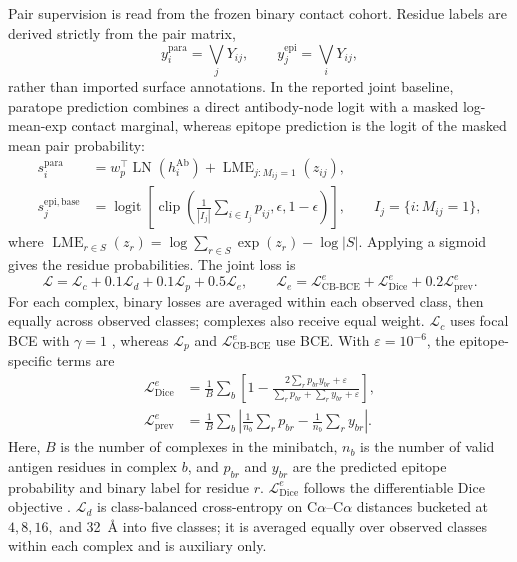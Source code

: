 \documentclass[10pt]{article}
\begin{document}
Pair supervision is read from the frozen binary contact cohort. Residue labels
are derived strictly from the pair matrix,
\begin{equation}
 y_i^{\mathrm{para}}=\bigvee_j Y_{ij}, \qquad
 y_j^{\mathrm{epi}}=\bigvee_i Y_{ij},
 \end{equation}
rather than imported surface annotations. In the reported joint baseline,
paratope prediction combines a direct antibody-node logit with a masked
log-mean-exp contact marginal, whereas epitope prediction is the logit of the
masked mean pair probability:
\begin{equation}
 \begin{aligned}
 s_i^{\mathrm{para}}
 &=w_p^\top\operatorname{LN}(h_i^{\mathrm{Ab}})
 +\operatorname{LME}_{j:M_{ij}=1}(z_{ij}),\\
 s_j^{\mathrm{epi,base}}
 &=\operatorname{logit}\!\left[
 \operatorname{clip}\!\left(
 \frac{1}{|I_j|}\sum_{i\in I_j}p_{ij},\epsilon,1-\epsilon
 \right)\right],
 \qquad I_j=\{i:M_{ij}=1\},
 \end{aligned}
 \label{eq:baseline-residue-readouts}
\end{equation}
where $\operatorname{LME}_{r\in S}(z_r)=
\log\sum_{r\in S}\exp(z_r)-\log|S|$. Applying a sigmoid gives the residue
probabilities. The joint loss is
\begin{equation}
 \mathcal{L}=\mathcal{L}_{c}+0.1\mathcal{L}_{d}
 +0.1\mathcal{L}_{p}+0.5\mathcal{L}_{e}, \qquad
 \mathcal{L}_{e}=\mathcal{L}_{\mathrm{CB\text{-}BCE}}^{e}
 +\mathcal{L}_{\mathrm{Dice}}^{e}+0.2\mathcal{L}_{\mathrm{prev}}^{e}.
 \label{eq:loss}
\end{equation}
For each complex, binary losses are averaged within each observed class, then
equally across observed classes; complexes also receive equal weight.
$\mathcal{L}_{c}$ uses focal BCE with $\gamma=1$ \citep{lin2017focal}, whereas
$\mathcal{L}_{p}$ and $\mathcal{L}_{\mathrm{CB\text{-}BCE}}^{e}$ use BCE.
With $\varepsilon=10^{-6}$, the epitope-specific terms are
\begin{equation}
 \begin{aligned}
 \mathcal{L}_{\mathrm{Dice}}^{e}
 &=\frac1B\sum_b\!\left[1-
 \frac{2\sum_r p_{br}y_{br}+\varepsilon}
 {\sum_r p_{br}+\sum_r y_{br}+\varepsilon}\right],\\
 \mathcal{L}_{\mathrm{prev}}^{e}
 &=\frac1B\sum_b\left|
 \frac1{n_b}\sum_r p_{br}-\frac1{n_b}\sum_r y_{br}\right|.
 \end{aligned}
 \label{eq:epitope-loss}
\end{equation}
Here, $B$ is the number of complexes in the minibatch, $n_b$ is the number of
valid antigen residues in complex $b$, and $p_{br}$ and $y_{br}$ are the
predicted epitope probability and binary label for residue $r$.
$\mathcal{L}_{\mathrm{Dice}}^{e}$ follows the differentiable Dice objective
\citep{milletari2016vnet}.
$\mathcal{L}_{d}$ is class-balanced cross-entropy on C$\alpha$--C$\alpha$
distances bucketed at $4,8,16,$ and \SI{32}{\angstrom} into five classes; it is
averaged equally over observed classes within each complex and is auxiliary only.
\end{document}

